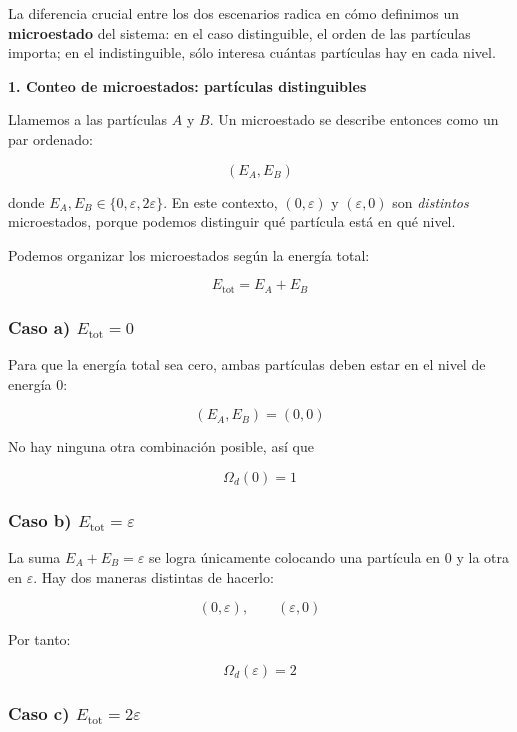 \documentclass{article}
\begin{document}
La diferencia crucial entre los dos escenarios radica en cómo definimos un
\textbf{microestado} del sistema: en el caso distinguible, el orden de las
partículas importa; en el indistinguible, sólo interesa cuántas partículas hay
en cada nivel.


\textcolor{Apple Green}{\textbf{1. Conteo de microestados: partículas distinguibles}}

Llamemos a las partículas \(A\) y \(B\).  
Un microestado se describe entonces como un par ordenado:

\[
(E_{A},E_{B})
\]

donde \(E_{A},E_{B} \in \{0,\varepsilon,2\varepsilon\}\).  
En este contexto, \((0,\varepsilon)\) y \((\varepsilon,0)\) son \emph{distintos}
microestados, porque podemos distinguir qué partícula está en qué nivel.

Podemos organizar los microestados según la energía total:

\[
E_{\mathrm{tot}} = E_{A} + E_{B}
\]

\subsubsection*{Caso a) \(E_{\mathrm{tot}}=0\)}

Para que la energía total sea cero, ambas partículas deben estar en el nivel
de energía \(0\):

\[
(E_{A},E_{B}) = (0,0)
\]

No hay ninguna otra combinación posible, así que

\[
\boxed{\Omega_{d}(0) = 1}
\]

\subsubsection*{Caso b) \(E_{\mathrm{tot}}=\varepsilon\)}

La suma \(E_{A} + E_{B} = \varepsilon\) se logra únicamente colocando una
partícula en \(0\) y la otra en \(\varepsilon\). Hay dos maneras distintas
de hacerlo:

\[
(0,\varepsilon),\qquad (\varepsilon,0)
\]

Por tanto:

\[
\boxed{\Omega_{d}(\varepsilon) = 2}
\]

\subsubsection*{Caso c) \(E_{\mathrm{tot}}=2\varepsilon\)}
\end{document}
